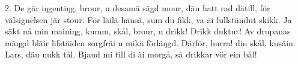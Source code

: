 2.  De gär iŋgentiŋg, brour,
    u desamä sägd mour,
    däu hatt rad dätill, för välsignelsen jär stour.
    För läilä häusä, sum du fikk,
    va äi fullständut skikk.
    Ja säkt nå min mainiŋg, kumm, skål, brour, u drikk!
    Drikk duktut! Av drupanas mäŋgd
    bläir lifstäiden sorgfräi u mikä förläŋgd.
    Därför, hurra! din skål,
    kusäin Lars, däu nukk tål.
    Bjaud mi till di äi morgå, så drikkar vör ein bål!
